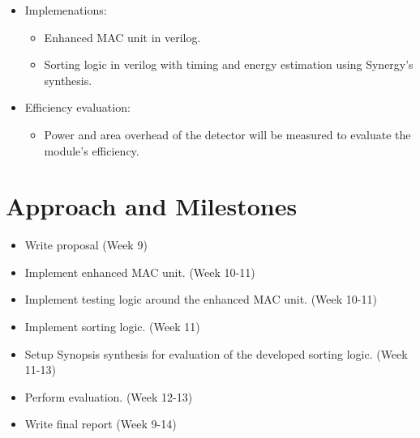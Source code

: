 \documentclass[11pt]{article}
\begin{document}
\begin{itemize}
    \item Implemenations:
    \begin{itemize}
        \item Enhanced MAC unit in verilog.
        \item Sorting logic in verilog with timing and energy estimation using Synergy's synthesis.
    \end{itemize}
    \item Efficiency evaluation:
    \begin{itemize}
        \item Power and area overhead of the detector will be measured to evaluate the module's efficiency.
    \end{itemize}
\end{itemize}

\section{Approach and Milestones}

\begin{itemize}
    \item Write proposal (Week 9)
    \item Implement enhanced MAC unit. (Week 10-11)
    \item Implement testing logic around the enhanced MAC unit. (Week 10-11)
    \item Implement sorting logic. (Week 11)
    \item Setup Synopsis synthesis for evaluation of the developed sorting logic. (Week 11-13)
    \item Perform evaluation. (Week 12-13)
    \item Write final report (Week 9-14)
\end{itemize}



\end{document}
